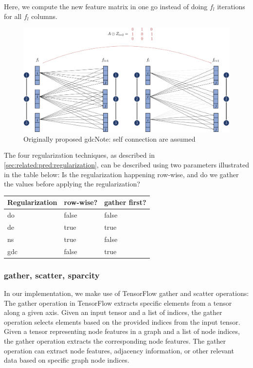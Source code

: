Here, we compute the new feature matrix in one go instead of doing $f_{l}$ iterations for all $f_{l}$ columns.
\begin{figure}[ht]
    \centering
    \includegraphics[width= 0.90\linewidth]{gfx/implementation/GDC-eq5.pdf}
    \caption{Originally proposed \ac{gdc}Note: self connection are assumed}\label{fig:implementaion:GDC-eq5}
\end{figure}




The four regularization techniques, as described in \ref{sec:related:pred:regularization}, can be described using two parameters illustrated in the table below: Is the regularization happening row-wise, and do we gather the values before applying the regularization?
\begin{center}
    \begin{tabular}{lll}
        \toprule
        \textbf{Regularization} & \textbf{row-wise?} & \textbf{gather first?} \\
        \midrule
        \acf{do}                & false              & false                  \\
        \acf{de}                & true               & true                   \\
        \acf{ns}                & true               & false                  \\
        \acf{gdc}               & false              & true                   \\

        \bottomrule
    \end{tabular}
\end{center}
\subsubsection{gather, scatter, sparcity}
In our implementation, we make use of TensorFlow gather and scatter operations:
The gather operation in TensorFlow extracts specific elements from a tensor along a given axis. Given an input tensor and a list of indices, the gather operation selects elements based on the provided indices from the input tensor. Given a tensor representing node features in a graph and a list of node indices, the gather operation extracts the corresponding node features. The gather operation can extract node features, adjacency information, or other relevant data based on specific graph node indices.

